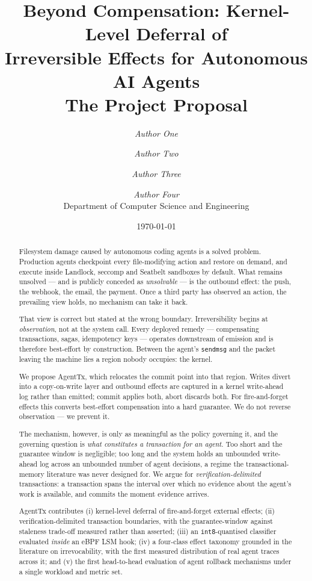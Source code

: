 \documentclass[10pt,twocolumn]{article}
\title{\vspace{-1.5em}\textbf{Beyond Compensation: Kernel-Level Deferral of\\
Irreversible Effects for Autonomous AI Agents}\\[0.3em]
\large The \sys{} Project Proposal}
\author{
  \textit{Author One} \and \textit{Author Two} \and
  \textit{Author Three} \and \textit{Author Four}\\[0.3em]
  \small Department of Computer Science and Engineering\\
  \small \todo{Institution} \quad \todo{Course code, B.Tech.\ Year III}
}
\date{\today}
\newcommand{\sys}{AgentTx}
\begin{document}
\maketitle

\begin{abstract}
Filesystem damage caused by autonomous coding agents is a solved problem.
Production agents checkpoint every file-modifying action and restore on demand,
and execute inside Landlock, seccomp and Seatbelt sandboxes by default. What
remains unsolved --- and is publicly conceded as \emph{unsolvable} --- is the
outbound effect: the push, the webhook, the email, the payment. Once a third
party has observed an action, the prevailing view holds, no mechanism can take
it back.

That view is correct but stated at the wrong boundary. Irreversibility begins at
\emph{observation}, not at the system call. Every deployed remedy ---
compensating transactions, sagas, idempotency keys --- operates downstream of
emission and is therefore best-effort by construction. Between the agent's
\texttt{sendmsg} and the packet leaving the machine lies a region nobody
occupies: the kernel.

We propose \sys{}, which relocates the commit point into that region. Writes
divert into a copy-on-write layer and outbound effects are captured in a kernel
write-ahead log rather than emitted; commit applies both, abort discards both.
For fire-and-forget effects this converts best-effort compensation into a hard
guarantee. We do not reverse observation --- we prevent it.

The mechanism, however, is only as meaningful as the policy governing it, and
the governing question is \emph{what constitutes a transaction for an agent}.
Too short and the guarantee window is negligible; too long and the system holds
an unbounded write-ahead log across an unbounded number of agent decisions,
a regime the transactional-memory literature was never designed for. We argue
for \emph{verification-delimited} transactions: a transaction spans the interval
over which no evidence about the agent's work is available, and commits the
moment evidence arrives.

\sys{} contributes (i) kernel-level deferral of fire-and-forget external
effects; (ii) verification-delimited transaction boundaries, with the
guarantee-window against staleness trade-off measured rather than asserted;
(iii) an \texttt{int8}-quantised classifier evaluated \emph{inside} an eBPF LSM
hook; (iv) a four-class effect taxonomy grounded in the literature on
irrevocability, with the first measured distribution of real agent traces across
it; and (v) the first head-to-head evaluation of agent rollback mechanisms under
a single workload and metric set.
\end{abstract}
\end{document}
